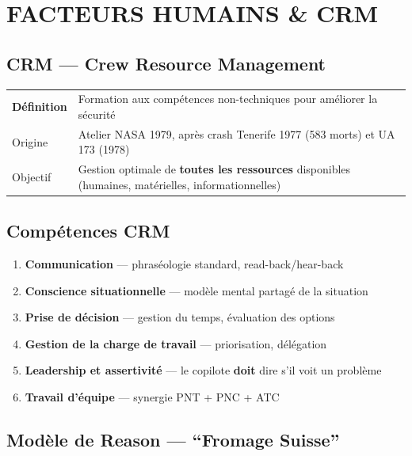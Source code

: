 \section{FACTEURS HUMAINS \& CRM}

\subsection{CRM --- Crew Resource Management}

\begin{tabular}{p{4cm}p{10.5cm}}
\toprule
\textbf{Définition} & Formation aux compétences non-techniques pour améliorer la sécurité \\
Origine & Atelier NASA 1979, après crash Tenerife 1977 (583 morts) et UA 173 (1978) \\
Objectif & Gestion optimale de \textbf{toutes les ressources} disponibles (humaines, matérielles, informationnelles) \\
\bottomrule
\end{tabular}

\subsection{Compétences CRM}
\begin{enumerate}[nosep]
\item \textbf{Communication} --- phraséologie standard, read-back/hear-back
\item \textbf{Conscience situationnelle} --- modèle mental partagé de la situation
\item \textbf{Prise de décision} --- gestion du temps, évaluation des options
\item \textbf{Gestion de la charge de travail} --- priorisation, délégation
\item \textbf{Leadership et assertivité} --- le copilote \textbf{doit} dire s'il voit un problème
\item \textbf{Travail d'équipe} --- synergie PNT + PNC + ATC
\end{enumerate}

\subsection{Modèle de Reason --- ``Fromage Suisse''}

\begin{center}
\end{center}

